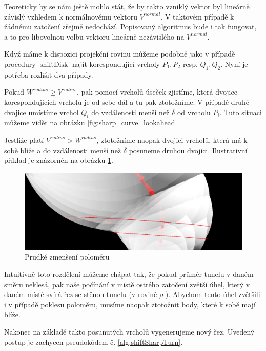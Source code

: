 Teoreticky by se nám ještě mohlo stát, že by takto vzniklý vektor byl lineárně
závislý vzhledem k normálnovému vektoru $ V^{normal} $. V taktovém případě k žádnému
zatočení zřejmě nedochází. Popisovaný algoritmus bude i tak fungovat,
a to pro libovolnou volbu vektoru lineárně nezávislého na $ V^{normal} $.

Když máme k dispozici projekční rovinu můžeme podobně jako v případě
procedury $ \operatorname{shiftDisk} $ najít korespondující
vrcholy $ P_1, P_2 $ resp. $ Q_1, Q_2 $. Nyní je potřeba rozlišit dva případy.

Pokud $ W^{radius} \geq V^{radius} $, pak pomocí vrcholů úseček zjistíme, která
dvojice korespondujicích vrcholů je od sebe dál a tu pak ztotožníme. V případě
druhé dvojice umístíme vrchol $Q_i $ do vzdálenosti menší než $\delta$ od vrcholu
$ P_i $. Tuto situaci můžeme vidět na obrázku \ref{fig:sharp_curve_lookahead}.

Jestliže platí $ V^{radius} > W^{radius} $, ztotožníme naopak dvojici vrcholů,
která má k sobě blíže a do vzdálenosti menší než $\delta$ posuneme druhou dvojici.
Ilustrativní příklad je znázorněn na obrázku \ref{fig:sharp_curve_lookahead_decrease}.

\begin{figure}[ht]
    \centering
    \includegraphics[width=\textwidth]{img/sharp_curve_lookahead_decrease.png}
    \caption{Prudké zmenšení poloměru}
  \centering
  \label{fig:sharp_curve_lookahead_decrease}
\end{figure}

Intuitivně toto rozdělení můžeme chápat tak, že pokud průměr tunelu v daném směru
neklesá, pak naše počínání v místě ostrého zatočení zvětší úhel, který v daném
místě svírá řez se stěnou tunelu (v rovině $ \rho $ ). Abychom tento úhel zvětšili
i v případě poklesu poloměru, musíme naopak ztotožnit body, které k sobě mají
blíže.

Nakonec na základě takto posunutých vrcholů vygenerujeme nový řez. Uvedený
postup je zachycen pseudokódem č. \ref{alg:shiftSharpTurn}.

